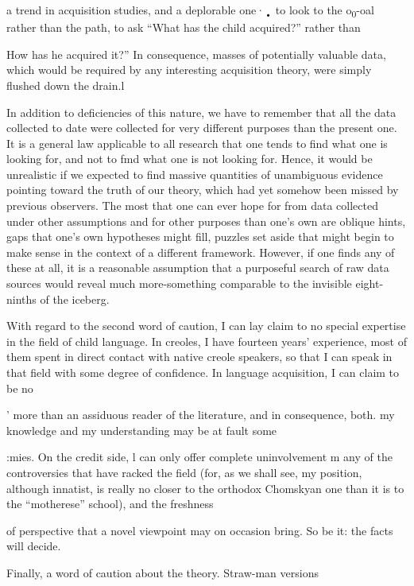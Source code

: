
a trend in acquisition studies, and a deplorable one·\textsubscript{•}\textsubscript{ }to look to the o\textsubscript{0}{}-oal rather than the path, to ask ``What has the child acquired?'' rather than

{\textquotedbl}How has he acquired it?'' In consequence, masses of potentially valuable data, which would be required by any interesting acquisition theory, were simply flushed down the drain.l

In addition to deficiencies of this nature, we have to remember that all the data collected to date were collected for very different purposes than the present one. It is a general law applicable to all research that one tends to find what one is looking for, and not to fmd what one is not looking for. Hence, it would be unrealistic if we expected to find massive quantities of unambiguous evidence pointing toward the truth of our theory, which had yet somehow been missed by previous observers. The most that one can ever hope for from data collected under other assumptions and for other purposes than one's own are oblique hints, gaps that one's own hypotheses might fill, puzzles set aside that might begin to make sense in the context of a different framework. However, if one finds any of these at all, it is a reasonable assumption that a purposeful search of raw data sources would reveal much more-something comparable to the invisible eight-ninths of the iceberg.

With regard to the second word of caution, I can lay claim to no special expertise in the field of child language. In creoles, I have fourteen years' experience, most of them spent in direct contact with native creole speakers, so that I can speak in that field with some degree of confidence. In language acquisition, I can claim to be no

' more than an assiduous reader of the literature, and in consequence, both. my knowledge and my understanding may be at fault some\-

:mies. On the credit side, l can only offer complete uninvolvement m any of the controversies that have racked the field (for, as we shall see, my position, although innatist, is really no closer to the orthodox Chomskyan one than it is to the ``motherese'' school), and the freshness

of perspective that a novel viewpoint may on occasion bring. So be it: the facts will decide.

Finally, a word of caution about the theory. Straw-man versions

